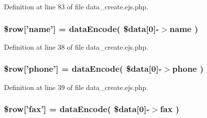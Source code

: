 \-Definition at line 83 of file data\-\_\-create.\-ejs.\-php.

\hypertarget{patientfile_2immnunization_2data__create_8ejs_8php_a63a1136a683bf9c4637010f73791443a}{
\subsubsection[{\$row}]{\setlength{\rightskip}{0pt plus 5cm}\$row\mbox{[}'name'\mbox{]} = {\bf data\-Encode}( \$data\mbox{[}0\mbox{]}-\/$>$name )}}\label{patientfile_2immnunization_2data__create_8ejs_8php_a63a1136a683bf9c4637010f73791443a}


\-Definition at line 38 of file data\-\_\-create.\-ejs.\-php.

\hypertarget{patientfile_2immnunization_2data__create_8ejs_8php_a9eb773d64ffa16faf1e29ccbaf4f065c}{
\subsubsection[{\$row}]{\setlength{\rightskip}{0pt plus 5cm}\$row\mbox{[}'phone'\mbox{]} = {\bf data\-Encode}( \$data\mbox{[}0\mbox{]}-\/$>$phone )}}\label{patientfile_2immnunization_2data__create_8ejs_8php_a9eb773d64ffa16faf1e29ccbaf4f065c}


\-Definition at line 39 of file data\-\_\-create.\-ejs.\-php.

\hypertarget{patientfile_2immnunization_2data__create_8ejs_8php_addcf6434ea14720a2fb19d21dc55a8c9}{
\subsubsection[{\$row}]{\setlength{\rightskip}{0pt plus 5cm}\$row\mbox{[}'fax'\mbox{]} = {\bf data\-Encode}( \$data\mbox{[}0\mbox{]}-\/$>$fax )}}\label{patientfile_2immnunization_2data__create_8ejs_8php_addcf6434ea14720a2fb19d21dc55a8c9}


